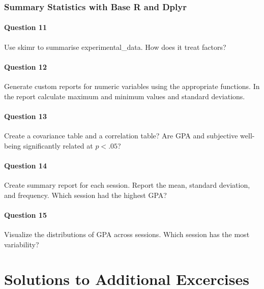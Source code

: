 \documentclass[]{book}
\theoremstyle{definition}
\theoremstyle{definition}
\theoremstyle{definition}
\theoremstyle{remark}
\begin{document}
\hypertarget{summary-statistics-with-base-r-and-dplyr}{%
\section{Summary Statistics with Base R and Dplyr}\label{summary-statistics-with-base-r-and-dplyr}}

\hypertarget{question-11}{%
\subsection{Question 11}\label{question-11}}

Use skimr to summarise experimental\_data. How does it treat factors?

\hypertarget{question-12}{%
\subsection{Question 12}\label{question-12}}

Generate custom reports for numeric variables using the appropriate functions. In the report calculate maximum and minimum values and standard deviations.

\hypertarget{question-13}{%
\subsection{Question 13}\label{question-13}}

Create a covariance table and a correlation table? Are GPA and subjective well-being significantly related at \(p < .05\)?

\hypertarget{question-14}{%
\subsection{Question 14}\label{question-14}}

Create summary report for each session. Report the mean, standard deviation, and frequency. Which session had the highest GPA?

\hypertarget{question-15}{%
\subsection{Question 15}\label{question-15}}

Visualize the distributions of GPA across sessions. Which session has the most variability?

\hypertarget{part-solutions-to-additional-excercises}{%
\part{Solutions to Additional Excercises}\label{part-solutions-to-additional-excercises}}
\end{document}
